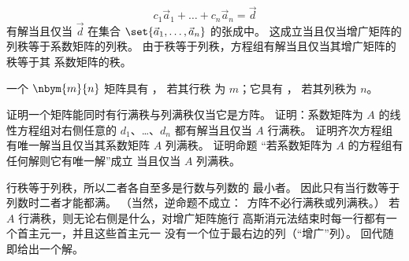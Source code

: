 \begin{exercises}
\begin{answer}
\begin{equation*}
        c_1\vec{a}_1+\dots+c_n\vec{a}_n=\vec{d}
      \end{equation*}
      有解当且仅当 \( \vec{d} \) 在集合 \( \set{\vec{a}_1,\dots,\vec{a}_n} \)
      的张成中。
      这成立当且仅当增广矩阵的列秩等于系数矩阵的列秩。
      由于秩等于列秩，方程组有解当且仅当其增广矩阵的秩等于其
      系数矩阵的秩。
    \end{answer}
  \item
    一个 \( \nbym{m}{n} \) 矩阵具有
    ，
    若其行秩
    为 \( m \)；它具有
    ，
    若其列秩为 \( n \)。
    \begin{exparts}
      \partsitem 证明一个矩阵能同时有行满秩与列满秩仅当它是方阵。
      \partsitem 证明：系数矩阵为 \( A \) 的线性方程组对右侧任意的
        \( d_1 \)、\ldots、\( d_n \) 都有解当且仅当 \( A \) 行满秩。
      \partsitem 证明齐次方程组有唯一解当且仅当其系数矩阵
        $A$ 列满秩。
      \partsitem 证明命题
       “若系数矩阵为 \( A \) 的方程组有任何解则它有唯一解”成立
        当且仅当 \( A \) 列满秩。
    \end{exparts}
    \begin{answer}
      \begin{exparts}
        \partsitem 行秩等于列秩，所以二者各自至多是行数与列数的
          最小者。
          因此只有当行数等于列数时二者才能都满。
          （当然，逆命题不成立：~方阵不必行满秩或列满秩。）
        \partsitem 若 \( A \) 行满秩，则无论右侧是什么，对增广矩阵施行
          高斯消元法结束时每一行都有一个首主元一，并且这些首主元一
          没有一个位于最右边的列（“增广”列）。
          回代随即给出一个解。


\end{exparts}
\end{answer}
\end{exercises}
